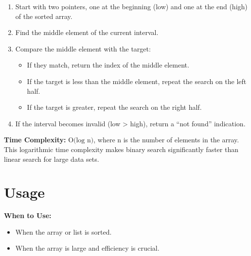 \documentclass[
  letterpaper,
  DIV=11,
  numbers=noendperiod]{scrreprt}
\providecommand{\tightlist}{%
  \setlength{\itemsep}{0pt}\setlength{\parskip}{0pt}}
\begin{document}
\begin{enumerate}
\def\labelenumi{\arabic{enumi}.}
\tightlist
\item
  Start with two pointers, one at the beginning (low) and one at the end
  (high) of the sorted array.
\item
  Find the middle element of the current interval.
\item
  Compare the middle element with the target:

  \begin{itemize}
  \tightlist
  \item
    If they match, return the index of the middle element.
  \item
    If the target is less than the middle element, repeat the search on
    the left half.
  \item
    If the target is greater, repeat the search on the right half.
  \end{itemize}
\item
  If the interval becomes invalid (low \textgreater{} high), return a
  ``not found'' indication.
\end{enumerate}

\textbf{Time Complexity:} \(\text{O(log⁡ n)}\), where n is the number of
elements in the array. This logarithmic time complexity makes binary
search significantly faster than linear search for large data sets.

\section{Usage}

\textbf{When to Use:}

\begin{itemize}
\tightlist
\item
  When the array or list is sorted.
\item
  When the array is large and efficiency is crucial.
\end{itemize}
\end{document}
